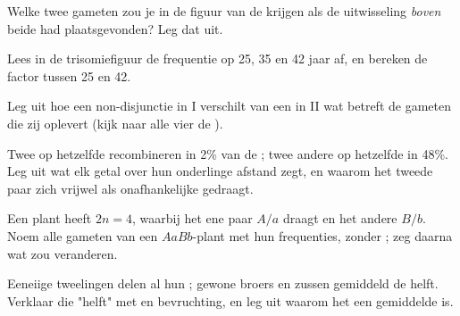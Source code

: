 \begin{exercise}[$\star\star$]\label{exo:g12:meiosis-genetic-shuffling:9}
Welke twee gameten zou je in de figuur van de  krijgen als de
uitwisseling \emph{boven} beide  had plaatsgevonden? Leg dat uit.
\end{exercise}

\begin{exercise}[$\star\star$]\label{exo:g12:meiosis-genetic-shuffling:10}
Lees in de trisomiefiguur de frequentie op 25, 35 en 42 jaar af, en
bereken de factor tussen 25 en 42.
\end{exercise}

\begin{exercise}[$\star\star$]\label{exo:g12:meiosis-genetic-shuffling:11}
Leg uit hoe een non-disjunctie in  I verschilt van een in  II
wat betreft de gameten die zij oplevert (kijk naar alle vier de ).
\end{exercise}

\begin{exercise}[$\star\star\star$]\label{exo:g12:meiosis-genetic-shuffling:12}
Twee  op hetzelfde  recombineren in 2\% van de ;
twee andere op hetzelfde  in 48\%. Leg uit wat elk getal over
hun onderlinge afstand zegt, en waarom het tweede paar zich vrijwel als
onafhankelijke  gedraagt.
\end{exercise}

\begin{exercise}[$\star\star\star$]\label{exo:g12:meiosis-genetic-shuffling:13}
Een plant heeft $2n = 4$, waarbij het ene paar $A/a$ draagt en het andere
$B/b$. Noem alle gameten van een $AaBb$-plant met hun frequenties, zonder
; zeg daarna wat  zou veranderen.
\end{exercise}

\begin{exercise}[$\star\star\star$]\label{exo:g12:meiosis-genetic-shuffling:14}
Eeneiige tweelingen delen al hun ; gewone broers en zussen
gemiddeld de helft. Verklaar die "helft" met  en bevruchting, en leg
uit waarom het een gemiddelde is.
\end{exercise}

